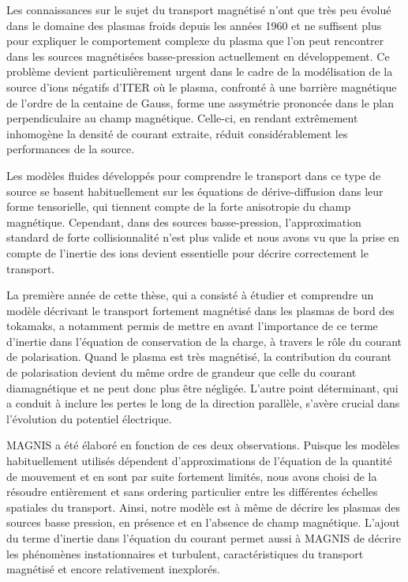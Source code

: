 Les connaissances sur le sujet du transport magnétisé n'ont que très peu évolué
dans le domaine des plasmas froids depuis les années 1960 et ne suffisent plus
pour expliquer le comportement complexe du plasma que l'on peut rencontrer dans
les sources magnétisées basse-pression actuellement en développement.
Ce problème devient particulièrement urgent dans le cadre de la modélisation de
la source d'ions négatifs d'ITER où le plasma, confronté à une barrière
magnétique de l'ordre de la centaine de Gauss, forme une assymétrie prononcée
dans le plan perpendiculaire au champ magnétique. Celle-ci, en rendant
extrêmement inhomogène la densité de courant extraite, réduit considérablement
les performances de la source.

Les modèles fluides développés pour comprendre le transport dans ce type de
source se basent habituellement sur les équations de dérive-diffusion dans leur
forme tensorielle, qui tiennent compte de la forte anisotropie du champ
magnétique.
Cependant, dans des sources basse-pression,
l'approximation standard de forte collisionnalité n'est plus
valide et nous avons vu que la prise en compte de l'inertie des ions devient
essentielle pour décrire correctement le transport. 

La première année de cette thèse, qui a consisté à étudier et comprendre un
modèle décrivant le transport fortement magnétisé dans les plasmas de
bord des tokamaks, a notamment permis de mettre en avant l'importance de ce
terme d'inertie dans l'équation de conservation de la charge, à travers le rôle
du courant de polarisation.
Quand le plasma est très magnétisé, la contribution du courant de polarisation
devient du même ordre de grandeur que celle du courant diamagnétique et ne
peut donc plus être négligée. L'autre point déterminant, qui a conduit à
inclure les pertes le long de la direction parallèle, s'avère crucial dans
l'évolution du potentiel électrique.

MAGNIS a été élaboré en fonction de ces deux observations. Puisque les modèles
habituellement utilisés dépendent d'approximations de
l'équation de la quantité de mouvement et en sont par suite fortement limités,
nous avons choisi de la résoudre entièrement et sans ordering particulier entre les
différentes échelles spatiales du transport. Ainsi, notre modèle est à même de
décrire les plasmas des sources basse pression, en présence et en l'absence de champ magnétique.
L'ajout du terme d'inertie dans l'équation du courant permet aussi à MAGNIS de
décrire les phénomènes instationnaires et turbulent, caractéristiques du
transport magnétisé et encore relativement inexplorés. 

